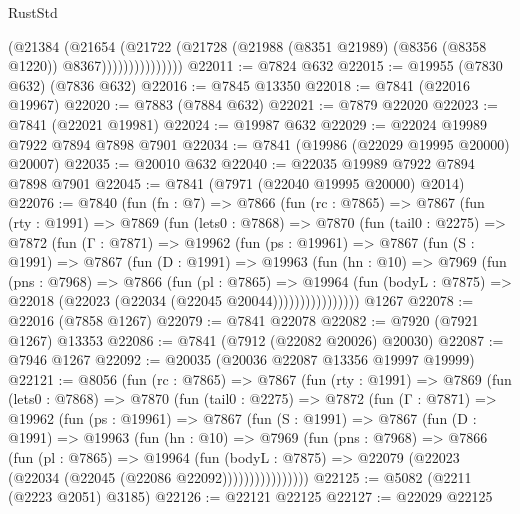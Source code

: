 \begin{lexlean}{RustStd}
\begin{coremodule}
{\begin{coremodule}
{{{{{{{{{{{{{{{{{{{{{{{{{{{{{{{{{{{{{{{{{{{{{{{{{{{{{{                        (@21384
                          (@21654
                            (@21722
                              (@21728
                                (@21988 (@8351 @21989) (@8356 (@8358 @1220)) @8367)))))))))))))))
@22011 := @7824 @632
@22015 := @19955 (@7830 @632) (@7836 @632)
@22016 := @7845 @13350
@22018 := @7841 (@22016 @19967)
@22020 := @7883 (@7884 @632)
@22021 := @7879 @22020
@22023 := @7841 (@22021 @19981)
@22024 := @19987 @632
@22029 := @22024 @19989 @7922 @7894 @7898 @7901
@22034 := @7841 (@19986 (@22029 @19995 @20000) @20007)
@22035 := @20010 @632
@22040 := @22035 @19989 @7922 @7894 @7898 @7901
@22045 := @7841 (@7971 (@22040 @19995 @20000) @2014)
@22076 := @7840
    (fun (fn : @7) =>
    @7866
      (fun (rc : @7865) =>
      @7867
        (fun (rty : @1991) =>
        @7869
          (fun (lets0 : @7868) =>
          @7870
            (fun (tail0 : @2275) =>
            @7872
              (fun (Γ : @7871) =>
              @19962
                (fun (ps : @19961) =>
                @7867
                  (fun (S : @1991) =>
                  @7867
                    (fun (D : @1991) =>
                    @19963
                      (fun (hn : @10) =>
                      @7969
                        (fun (pns : @7968) =>
                        @7866
                          (fun (pl : @7865) =>
                          @19964
                            (fun (bodyL : @7875) =>
                            @22018 (@22023 (@22034 (@22045 @20044))))))))))))))))
    @1267
@22078 := @22016 (@7858 @1267)
@22079 := @7841 @22078
@22082 := @7920 (@7921 @1267) @13353
@22086 := @7841 (@7912 (@22082 @20026) @20030)
@22087 := @7946 @1267
@22092 := @20035 (@20036 @22087 @13356 @19997 @19999)
@22121 := @8056
    (fun (rc : @7865) =>
    @7867
      (fun (rty : @1991) =>
      @7869
        (fun (lets0 : @7868) =>
        @7870
          (fun (tail0 : @2275) =>
          @7872
            (fun (Γ : @7871) =>
            @19962
              (fun (ps : @19961) =>
              @7867
                (fun (S : @1991) =>
                @7867
                  (fun (D : @1991) =>
                  @19963
                    (fun (hn : @10) =>
                    @7969
                      (fun (pns : @7968) =>
                      @7866
                        (fun (pl : @7865) =>
                        @19964
                          (fun (bodyL : @7875) =>
                          @22079 (@22023 (@22034 (@22045 (@22086 @22092))))))))))))))))
@22125 := @5082 (@2211 (@2223 @2051) @3185)
@22126 := @22121 @22125
@22127 := @22029 @22125
}}}}}}}}}}}}}}}}}}}}}}}}}}}}}}}}}}}}}}}}}}}}}}}}}}}}}}
\end{coremodule}}
\end{coremodule}
\end{lexlean}
